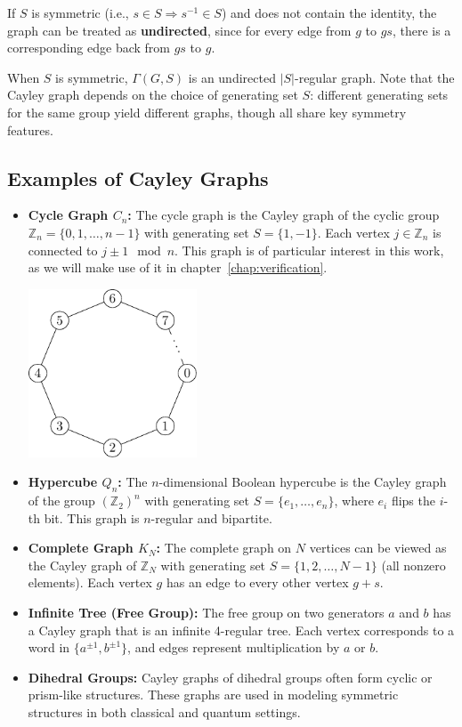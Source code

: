 \documentclass[12pt]{report}
\begin{document}
If $S$ is symmetric (i.e., $s \in S \Rightarrow s^{-1} \in S$) and does not contain the identity, the graph can be treated as \textbf{undirected}, since for every edge from $g$ to $gs$, there is a corresponding edge back from $gs$ to $g$.

When $S$ is symmetric, $\Gamma(G, S)$ is an undirected $|S|$-regular graph. Note that the Cayley graph depends on the choice of generating set $S$: different generating sets for the same group yield different graphs, though all share key symmetry features.

\subsection{Examples of Cayley Graphs}

\begin{itemize}
    \item \textbf{Cycle Graph $C_n$:} The cycle graph is the Cayley graph of the cyclic group $\mathbb{Z}_n = \{0, 1, \dots, n-1\}$ with generating set $S = \{1, -1\}$. Each vertex $j \in \mathbb{Z}_n$ is connected to $j \pm 1 \mod n$. This graph is of particular interest in this work, as we will make use of it in chapter~\ref{chap:verification}.
    \begin{center}
        \includegraphics[width = 5cm]{cyclic_graph.pdf}
    \end{center}
    \item \textbf{Hypercube $Q_n$:} The $n$-dimensional Boolean hypercube is the Cayley graph of the group $(\mathbb{Z}_2)^n$ with generating set $S = \{e_1, \dots, e_n\}$, where $e_i$ flips the $i$-th bit. This graph is $n$-regular and bipartite.

    \item \textbf{Complete Graph $K_N$:} The complete graph on $N$ vertices can be viewed as the Cayley graph of $\mathbb{Z}_N$ with generating set $S = \{1, 2, \dots, N-1\}$ (all nonzero elements). Each vertex $g$ has an edge to every other vertex $g+s$.

    \item \textbf{Infinite Tree (Free Group):} The free group on two generators $a$ and $b$ has a Cayley graph that is an infinite 4-regular tree. Each vertex corresponds to a word in $\{a^{\pm1}, b^{\pm1}\}$, and edges represent multiplication by $a$ or $b$.

    \item \textbf{Dihedral Groups:} Cayley graphs of dihedral groups often form cyclic or prism-like structures. These graphs are used in modeling symmetric structures in both classical and quantum settings.
\end{itemize}
\end{document}
